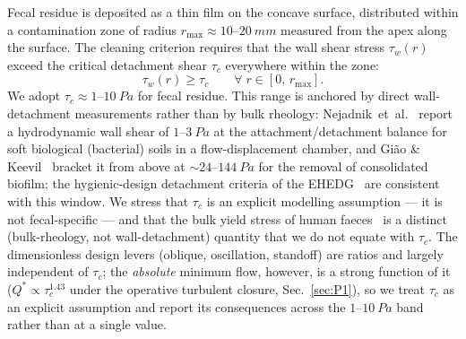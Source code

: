\documentclass[aps,prfluids,reprint,amsmath,amssymb,floatfix]{revtex4-2}
\begin{document}
Fecal residue is deposited as a thin film on the concave surface, distributed
within a contamination zone of radius $r_\mathrm{max} \approx 10$--$\SI{20}{mm}$
measured from the apex along the surface. The cleaning criterion requires
that the wall shear stress $\tau_w(r)$ exceed the critical detachment
shear $\tau_c$ everywhere within the zone:
\begin{equation}
  \tau_w(r) \geq \tau_c \qquad \forall\; r \in [0,\,r_\mathrm{max}].
  \label{eq:cleaning}
\end{equation}
We adopt $\tau_c \approx 1$--$\SI{10}{Pa}$ for fecal residue. This range is
anchored by direct wall-detachment measurements rather than by bulk rheology:
Nejadnik~et~al.~\citep{Nejadnik2008} report a hydrodynamic wall shear of
$1$--$\SI{3}{Pa}$ at the attachment/detachment balance for soft biological
(bacterial) soils in a flow-displacement chamber, and Gi\~ao \&
Keevil~\citep{Giao2013} bracket it from above at $\sim24$--$\SI{144}{Pa}$
for the removal of consolidated biofilm; the hygienic-design detachment
criteria of the EHEDG~\citep{Ehedg2003} are consistent with this window.
We stress that $\tau_c$ is an explicit modelling assumption --- it is not
fecal-specific --- and that the bulk yield stress of human
faeces~\citep{Woolley2014} is a distinct (bulk-rheology, not wall-detachment)
quantity that we do not equate with $\tau_c$. The dimensionless design levers
(oblique, oscillation, standoff) are ratios and largely independent of $\tau_c$;
the \emph{absolute} minimum flow, however, is a strong function of it
($Q^* \propto \tau_c^{1.43}$ under the operative turbulent closure,
Sec.~\ref{sec:P1}), so we treat $\tau_c$ as an explicit assumption and report
its consequences across the $1$--$\SI{10}{Pa}$ band rather than at a single value.
\end{document}
